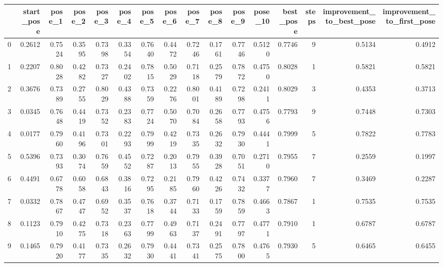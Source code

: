 \begin{tabular}{lrrrrrrrrrrrrrrr}
\toprule
{} &  start\_pose &  pose\_1 &  pose\_2 &  pose\_3 &  pose\_4 &  pose\_5 &  pose\_6 &  pose\_7 &  pose\_8 &  pose\_9 &  pose\_10 &  best\_pose &  steps &  improvement\_to\_best\_pose &  improvement\_to\_first\_pose \\
\midrule
0 &      0.2612 &  0.7524 &  0.3595 &  0.7398 &  0.3354 &  0.7640 &  0.4472 &  0.7246 &  0.1761 &  0.7746 &   0.5120 &     0.7746 &      9 &                    0.5134 &                     0.4912 \\
1 &      0.2207 &  0.8028 &  0.4282 &  0.7327 &  0.2402 &  0.7815 &  0.5029 &  0.7118 &  0.2579 &  0.7872 &   0.4750 &     0.8028 &      1 &                    0.5821 &                     0.5821 \\
2 &      0.3676 &  0.7389 &  0.2755 &  0.8029 &  0.4388 &  0.7359 &  0.2276 &  0.8001 &  0.4189 &  0.7298 &   0.2411 &     0.8029 &      3 &                    0.4353 &                     0.3713 \\
3 &      0.0345 &  0.7648 &  0.4419 &  0.7352 &  0.2383 &  0.7724 &  0.5070 &  0.7084 &  0.2658 &  0.7793 &   0.4756 &     0.7793 &      9 &                    0.7448 &                     0.7303 \\
4 &      0.0177 &  0.7960 &  0.4196 &  0.7301 &  0.2293 &  0.7999 &  0.4219 &  0.7335 &  0.2632 &  0.7930 &   0.4441 &     0.7999 &      5 &                    0.7822 &                     0.7783 \\
5 &      0.5396 &  0.7393 &  0.3074 &  0.7659 &  0.4552 &  0.7287 &  0.2013 &  0.7955 &  0.3928 &  0.7051 &   0.2710 &     0.7955 &      7 &                    0.2559 &                     0.1997 \\
6 &      0.4491 &  0.6778 &  0.6058 &  0.6843 &  0.3816 &  0.7295 &  0.2185 &  0.7960 &  0.4226 &  0.7432 &   0.3377 &     0.7960 &      7 &                    0.3469 &                     0.2287 \\
7 &      0.0332 &  0.7867 &  0.4747 &  0.6952 &  0.3537 &  0.7618 &  0.3744 &  0.7133 &  0.1759 &  0.7859 &   0.4663 &     0.7867 &      1 &                    0.7535 &                     0.7535 \\
8 &      0.1123 &  0.7910 &  0.4275 &  0.7318 &  0.2363 &  0.7799 &  0.4963 &  0.7137 &  0.2491 &  0.7797 &   0.4771 &     0.7910 &      1 &                    0.6787 &                     0.6787 \\
9 &      0.1465 &  0.7920 &  0.4177 &  0.7335 &  0.2632 &  0.7930 &  0.4441 &  0.7341 &  0.2575 &  0.7800 &   0.4765 &     0.7930 &      5 &                    0.6465 &                     0.6455 \\
\bottomrule
\end{tabular}
